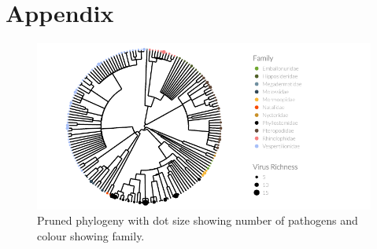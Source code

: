 \clearpage



















\section{Appendix}






\begin{knitrout}\footnotesize
{}\color{fgcolor}\begin{figure}[t]

{\centering \includegraphics[width=\textwidth]{figure/treePlot2-1} 

}

\caption[Pruned phylogeny \cite{jones2005bats} with dot size showing number of pathogens and colour showing family]{Pruned phylogeny \cite{jones2005bats} with dot size showing number of pathogens and colour showing family.}\label{fig:treePlot2}
\end{figure}


\end{knitrout}








